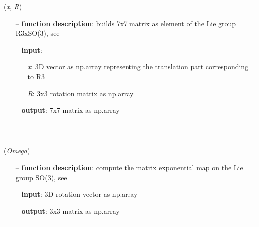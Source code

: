 \begin{itemize}[leftmargin=1.4cm]
\begin{itemize}[leftmargin=0.5cm]
\begin{itemize}[leftmargin=1.4cm]
\begin{itemize}[leftmargin=0.5cm]
\begin{itemize}[leftmargin=1.4cm]
\begin{itemize}[leftmargin=0.5cm]
\begin{itemize}[leftmargin=1.4cm]
\begin{itemize}[leftmargin=1.4cm]
\begin{itemize}[leftmargin=1.4cm]
\begin{itemize}[leftmargin=1.4cm]
\begin{itemize}[leftmargin=0.5cm]
\begin{flushleft}
\label{sec:lieGroupBasics:R3xSO3Matrix}
({\it x}, {\it R})
\end{flushleft}
\setlength{\itemindent}{0.7cm}
\begin{itemize}[leftmargin=0.7cm]
  \item[--]  {\bf function description}: builds 7x7 matrix as element of the Lie group R3xSO(3), see \cite{Bruels2011}  \item[--]  {\bf input}: \vspace{-6pt}
  \begin{itemize}[leftmargin=1.2cm]
\setlength{\itemindent}{-0.7cm}
    \item[] {\it x}: 3D vector as np.array representing the translation part corresponding to R3
    \item[] {\it    R}: 3x3 rotation matrix as np.array
  \end{itemize}
  \item[--]  {\bf output}: 7x7 matrix as np.array\vspace{12pt}\end{itemize}
%
\noindent\rule{8cm}{0.75pt}\vspace{1pt} \\ 
\begin{flushleft}
\label{sec:lieGroupBasics:ExpSO3}
({\it Omega})
\end{flushleft}
\setlength{\itemindent}{0.7cm}
\begin{itemize}[leftmargin=0.7cm]
  \item[--]  {\bf function description}: compute the matrix exponential map on the Lie group SO(3), see \cite{Mueller2017}  \item[--]  {\bf input}: 3D rotation vector as np.array  \item[--]  {\bf output}: 3x3 matrix as np.array\vspace{12pt}\end{itemize}
%
\noindent\rule{8cm}{0.75pt}\vspace{1pt} \\ 
\begin{flushleft}
\label{sec:lieGroupBasics:ExpS3}

\end{flushleft}
\end{itemize}
\end{itemize}
\end{itemize}
\end{itemize}
\end{itemize}
\end{itemize}
\end{itemize}
\end{itemize}
\end{itemize}
\end{itemize}
\end{itemize}
